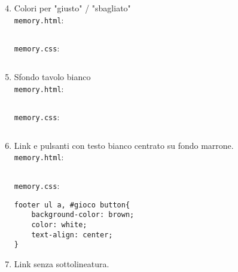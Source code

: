 \begin{frame}[fragile]\transfade
  \begin{sol}\centering
    \begin{enumerate}
      \setcounter{enumi}{3}
      \item Colori per "giusto" / "sbagliato"\\
      \texttt{memory.html}:
      \makeatletter
      \inputminted[breaklines, firstline=69, lastline=70]{html}{\html@dir/\jobname _\thehtml@count.html}
      \texttt{memory.css}:
      \inputminted[breaklines, firstline=15, lastline=20]{css}{\html@dir/\jobname _\thehtml@count.html}
      \item Sfondo tavolo bianco\\
      \texttt{memory.html}:
      \makeatletter
      \inputminted[breaklines, firstline=41, lastline=41]{html}{\html@dir/\jobname _\thehtml@count.html}
      \texttt{memory.css}:
      \inputminted[breaklines, firstline=22, lastline=24]{css}{\html@dir/\jobname _\thehtml@count.html}
      \makeatother
    \end{enumerate}
  \end{sol}
\end{frame}

\begin{frame}[fragile]\transfade
  \begin{sol}\centering
    \begin{enumerate}
      \setcounter{enumi}{5}
      \item Link e pulsanti con testo bianco centrato su fondo marrone.\\
      \texttt{memory.html}:
      \makeatletter
      \inputminted[breaklines, firstline=40, lastline=40]{html}{\html@dir/\jobname _\thehtml@count.html}
      \texttt{memory.css}:
      \begin{verbatim}
footer ul a, #gioco button{
    background-color: brown;
    color: white;
    text-align: center;
}
\end{verbatim}
      \item Link senza sottolineatura.
      \inputminted[breaklines, firstline=26, lastline=31]{css}{\html@dir/\jobname _\thehtml@count.html}
      \makeatother
    \end{enumerate}
  \end{sol}
\end{frame}